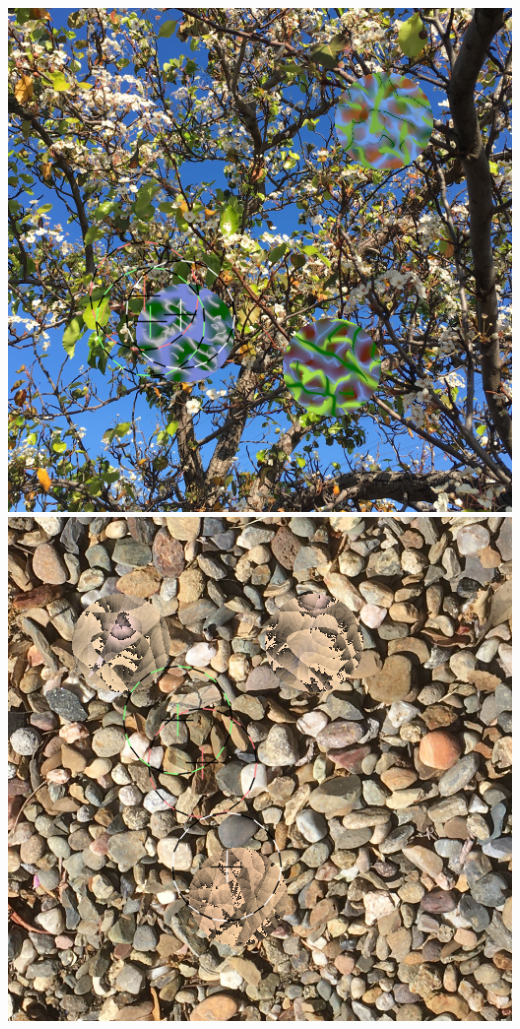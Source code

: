 \documentclass[sigconf]{acmart}
\begin{document}
\begin{teaserfigure}
    \includegraphics[scale=0.24]{images/20220926_step_6143.png}
    \hfill
    \includegraphics[scale=0.24]{images/20221003_step_3667.png}
    \hfill

\end{teaserfigure}
\end{document}
